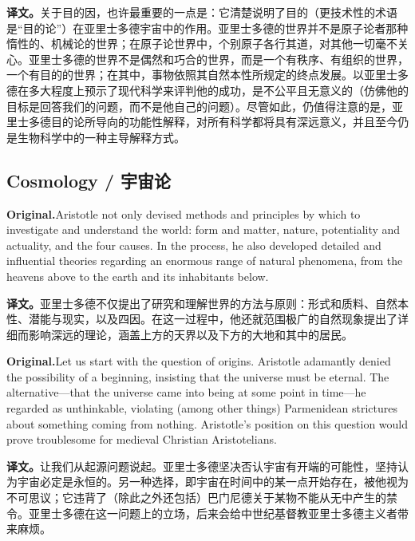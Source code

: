 \documentclass[UTF8]{ctexart}
\newcommand{\orig}{\par\noindent\textbf{Original.}\quad}
\newcommand{\zh}{\par\noindent\textbf{译文。}\quad}
\begin{document}
\zh 关于目的因，也许最重要的一点是：它清楚说明了目的（更技术性的术语是“目的论”）在亚里士多德宇宙中的作用。亚里士多德的世界并不是原子论者那种惰性的、机械论的世界；在原子论世界中，个别原子各行其道，对其他一切毫不关心。亚里士多德的世界不是偶然和巧合的世界，而是一个有秩序、有组织的世界，一个有目的的世界；在其中，事物依照其自然本性所规定的终点发展。以亚里士多德在多大程度上预示了现代科学来评判他的成功，是不公平且无意义的（仿佛他的目标是回答我们的问题，而不是他自己的问题）。尽管如此，仍值得注意的是，亚里士多德目的论所导向的功能性解释，对所有科学都将具有深远意义，并且至今仍是生物科学中的一种主导解释方式。

\subsection*{Cosmology / 宇宙论}

\orig Aristotle not only devised methods and principles by which to investigate and understand the world: form and matter, nature, potentiality and actuality, and the four causes. In the process, he also developed detailed and influential theories regarding an enormous range of natural phenomena, from the heavens above to the earth and its inhabitants below.

\zh 亚里士多德不仅提出了研究和理解世界的方法与原则：形式和质料、自然本性、潜能与现实，以及四因。在这一过程中，他还就范围极广的自然现象提出了详细而影响深远的理论，涵盖上方的天界以及下方的大地和其中的居民。

\orig Let us start with the question of origins. Aristotle adamantly denied the possibility of a beginning, insisting that the universe must be eternal. The alternative---that the universe came into being at some point in time---he regarded as unthinkable, violating (among other things) Parmenidean strictures about something coming from nothing. Aristotle's position on this question would prove troublesome for medieval Christian Aristotelians.

\zh 让我们从起源问题说起。亚里士多德坚决否认宇宙有开端的可能性，坚持认为宇宙必定是永恒的。另一种选择，即宇宙在时间中的某一点开始存在，被他视为不可思议；它违背了（除此之外还包括）巴门尼德关于某物不能从无中产生的禁令。亚里士多德在这一问题上的立场，后来会给中世纪基督教亚里士多德主义者带来麻烦。
\end{document}

